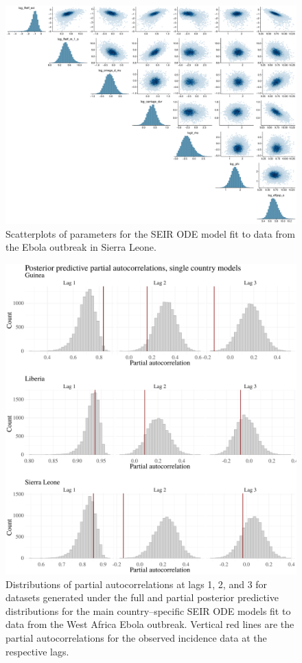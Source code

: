 \begin{figure}[htbp]
	\centering
	\includegraphics[width=\linewidth]{figures/sln_tight_pairs_ode}
	\caption{Scatterplots of parameters for the SEIR ODE model fit to data from the Ebola outbreak in Sierra Leone.}
	\label{fig:sierraleonepairsode}
\end{figure}

\begin{figure}[htbp]
	\begin{fullpage}
		\centering
		\includegraphics[width=0.8\linewidth]{figures/ebola_single_pacfs_ode}
		\caption[Posterior predictive distributions of partial autocorrelations for the main country--specific SEIR ODE models fit to data from the West Africa Ebola outbreak.]{Distributions of partial autocorrelations at lags 1, 2, and 3 for datasets generated under the full and partial posterior predictive distributions for the main country--specific SEIR ODE models fit to data from the West Africa Ebola outbreak. Vertical red lines are the partial autocorrelations for the observed incidence data at the respective lags.}
		\label{fig:ebola_single_pacfs_ode}
	\end{fullpage}
\end{figure}

